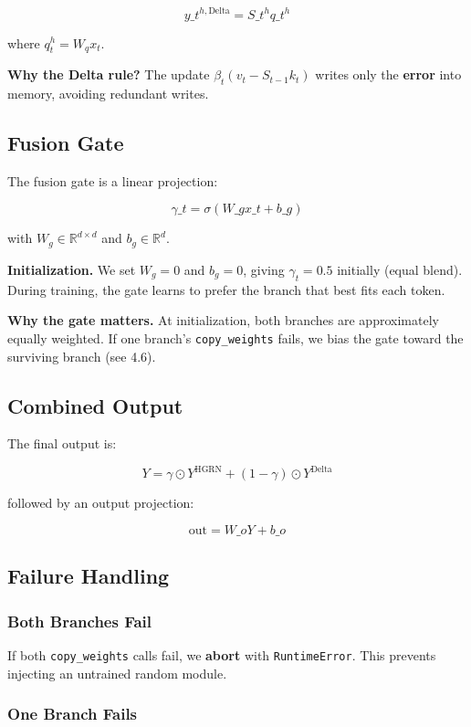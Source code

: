 \[
y\_t^{h, \text{Delta}} = S\_t^h q\_t^h
\tag{4.5}
\]

where $q_t^h = W_q x_t$.

\textbf{Why the Delta rule?} The update $\beta_t (v_t - S_{t-1} k_t)$ writes only 
the \textbf{error} into memory, avoiding redundant writes.

\subsection{Fusion Gate}

The fusion gate is a linear projection:

\[
\gamma\_t = \sigma(W\_g x\_t + b\_g)
\tag{4.6}
\]

with $W_g \in \mathbb{R}^{d \times d}$ and $b_g \in \mathbb{R}^d$.

\textbf{Initialization.} We set $W_g = 0$ and $b_g = 0$, giving 
$\gamma_t = 0.5$ initially (equal blend). During training, the gate learns 
to prefer the branch that best fits each token.

\textbf{Why the gate matters.} At initialization, both branches are 
approximately equally weighted. If one branch's \texttt{copy\_weights} fails, we 
bias the gate toward the surviving branch (see  4.6).

\subsection{Combined Output}

The final output is:

\[
Y = \gamma \odot Y^\text{HGRN} + (1 - \gamma) \odot Y^\text{Delta}
\tag{4.7}
\]

followed by an output projection:

\[
\text{out} = W\_o Y + b\_o
\tag{4.8}
\]

\subsection{Failure Handling}

\subsubsection{Both Branches Fail}

If both \texttt{copy\_weights} calls fail, we \textbf{abort} with \texttt{RuntimeError}. This 
prevents injecting an untrained random module.

\subsubsection{One Branch Fails}

